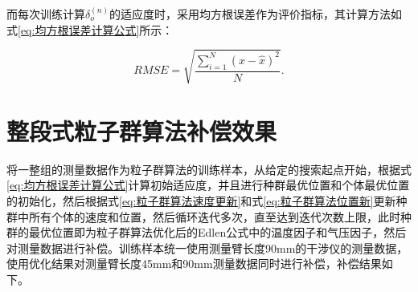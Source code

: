 而每次训练计算$\delta_o^{(n)}$的适应度时，采用均方根误差作为评价指标，其计算方法如式\eqref{eq:均方根误差计算公式}所示：

\begin{equation}\label{eq:均方根误差计算公式}
  RMSE = \sqrt{\frac{\sum_{i=1}^{N}(x-\widehat x)^2}{N}}.
  \end{equation}


\section{整段式粒子群算法补偿效果}
将一整组的测量数据作为粒子群算法的训练样本，从给定的搜索起点开始，根据式\eqref{eq:均方根误差计算公式}计算初始适应度，并且进行种群最优位置和个体最优位置的初始化，然后根据式\eqref{eq:粒子群算法速度更新}和式\eqref{eq:粒子群算法位置新}更新种群中所有个体的速度和位置，然后循环迭代多次，直至达到迭代次数上限，此时种群的最优位置即为粒子群算法优化后的Edlen公式中的温度因子和气压因子，然后对测量数据进行补偿。训练样本统一使用测量臂长度90mm的干涉仪的测量数据，使用优化结果对测量臂长度45mm和90mm测量数据同时进行补偿，补偿结果如下。

